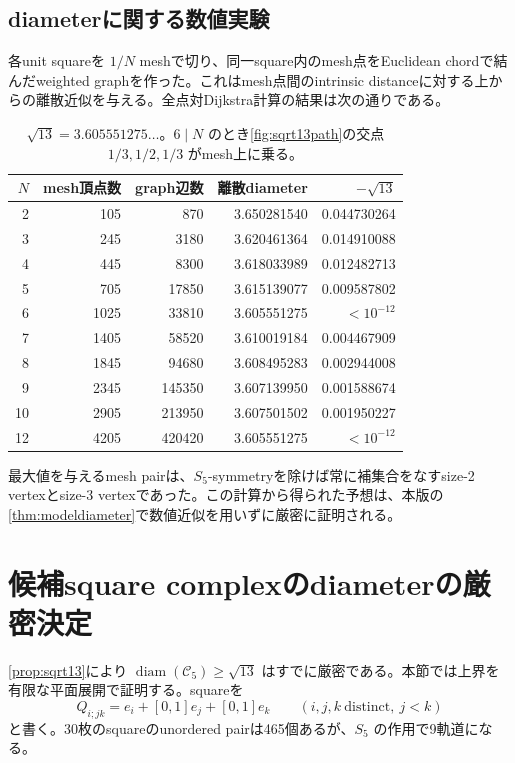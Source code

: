 \documentclass[11pt,a4paper]{ltjsarticle}
\theoremstyle{definition}
\theoremstyle{remark}
\newcommand{\cC}{\mathcal C}
\newcommand{\diam}{\operatorname{diam}}
\begin{document}
\subsection{diameterに関する数値実験}

各unit squareを $1/N$ meshで切り、同一square内のmesh点をEuclidean chordで結んだweighted graphを作った。これはmesh点間のintrinsic distanceに対する上からの離散近似を与える。全点対Dijkstra計算の結果は次の通りである。

\begin{table}[ht]
\centering
\begin{tabular}{rrrrr}
\toprule
$N$ & mesh頂点数 & graph辺数 & 離散diameter & $-\sqrt{13}$\\
\midrule
2  & 105  & 870    & 3.650281540 & 0.044730264\\
3  & 245  & 3180   & 3.620461364 & 0.014910088\\
4  & 445  & 8300   & 3.618033989 & 0.012482713\\
5  & 705  & 17850  & 3.615139077 & 0.009587802\\
6  & 1025 & 33810  & 3.605551275 & $<10^{-12}$\\
7  & 1405 & 58520  & 3.610019184 & 0.004467909\\
8  & 1845 & 94680  & 3.608495283 & 0.002944008\\
9  & 2345 & 145350 & 3.607139950 & 0.001588674\\
10 & 2905 & 213950 & 3.607501502 & 0.001950227\\
12 & 4205 & 420420 & 3.605551275 & $<10^{-12}$\\
\bottomrule
\end{tabular}
\caption{$\sqrt{13}=3.605551275\ldots$。$6\mid N$ のとき\cref{fig:sqrt13path}の交点 $1/3,1/2,1/3$ がmesh上に乗る。}
\label{tab:numerics}
\end{table}

最大値を与えるmesh pairは、$S_5$-symmetryを除けば常に補集合をなすsize-2 vertexとsize-3 vertexであった。この計算から得られた予想は、本版の\cref{thm:modeldiameter}で数値近似を用いずに厳密に証明される。


\section{候補square complexのdiameterの厳密決定}
\label{sec:exact-diameter}

\cref{prop:sqrt13}により $\diam(\cC_5)\geq\sqrt{13}$ はすでに厳密である。本節では上界を有限な平面展開で証明する。squareを
\[
 Q_{i;jk}=e_i+[0,1]e_j+[0,1]e_k
 \qquad(i,j,k\ \text{distinct},\ j<k)
\]
と書く。30枚のsquareのunordered pairは465個あるが、$S_5$ の作用で9軌道になる。
\end{document}
